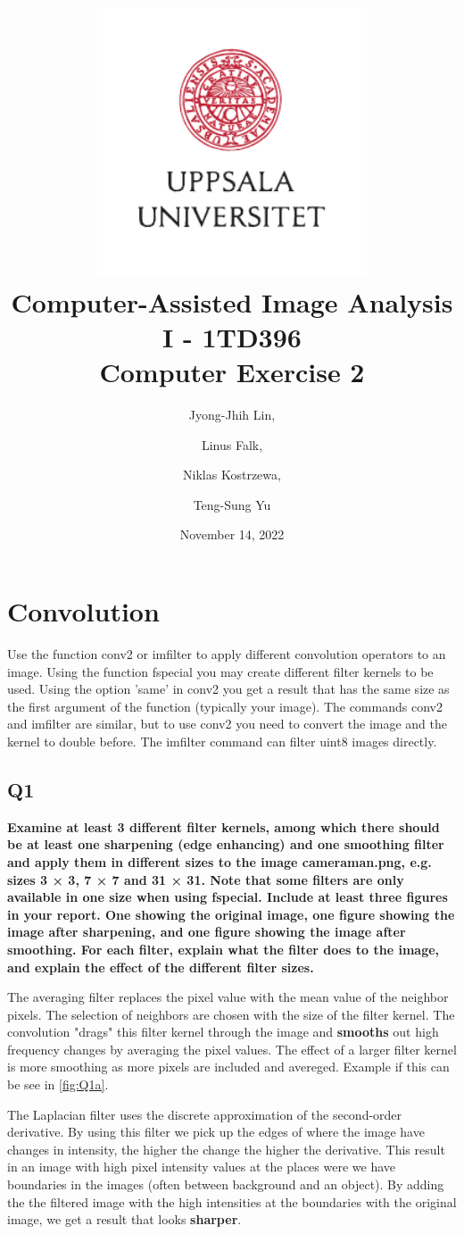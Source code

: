 \documentclass[oneside,a4paper]{article}
\title{
	\includegraphics[width=0.6\textwidth]{UU_logo.pdf}\\[1em]
	Computer-Assisted Image Analysis I - 1TD396\\[1em]
	Computer Exercise 2\\[3em]
}
\author{
	Jyong-Jhih Lin, \and Linus Falk, \and Niklas Kostrzewa, \and Teng-Sung Yu
}
\date{November 14, 2022}
\begin{document}
\maketitle
\thispagestyle{empty} %
\pagebreak

\section{Convolution}
\noindent Use the function conv2 or imfilter to apply different convolution operators to an image. Using the function fspecial you may create different filter kernels to be used. Using the option ’same’ in conv2 you get a result that has the same size as the first argument of the function (typically your image). The commands conv2 and imfilter are similar, but to use conv2 you need to convert the image and the kernel to double before. The imfilter command can filter uint8 images directly.


\subsection*{Q1}
\noindent \textbf{Examine at least 3 different filter kernels, among which there should be at least one sharpening (edge enhancing) and one smoothing filter and apply them in different sizes to the image cameraman.png, e.g. sizes 3 × 3, 7 × 7 and 31 × 31. Note that some filters are only available in one size when using fspecial. Include at least three figures in your report. One showing the original image, one figure showing the image after sharpening, and one figure showing the image after smoothing. For each filter, explain what the filter does to the image, and explain the effect of the different filter sizes.}

The averaging filter replaces the pixel value with the mean value of the neighbor pixels. The selection of neighbors are chosen with the size of the filter kernel. The convolution "drags" this filter kernel through the image and \textbf{smooths} out high frequency changes by averaging the pixel values. The effect of a larger filter kernel is more smoothing as more pixels are included and avereged. Example if this can be see in \ref{fig:Q1a}. 

The Laplacian filter uses the discrete approximation of the second-order derivative. By using this filter we pick up the edges of where the image have changes in intensity, the higher the change the higher the derivative. This result in an image with high pixel intensity values at the places were we have boundaries in the images (often between background and an object). By adding the the filtered image with the high intensities at the boundaries with the original image, we get a result that looks  \textbf{sharper}. 
\end{document}
